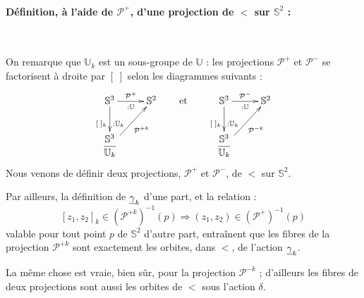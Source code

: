 \paragraph{D\'efinition, \`a l'aide de $\mathcal{P}^+$, d'une projection de $\lt$ sur $\mathbb{S}^2$ :}~\\
\par
On remarque que $\mathbb{U}_k$ est un sous-groupe de $\mathbb{U}$ : les projections $\mathcal{P}^+$ et $\mathcal{P}^-$ se factorisent \`a droite par $[\; ]$ selon les diagrammes suivants :
\[%
\xymatrix{%
\mathbb{S}^3\ar[d]_{[\; ]_k}^{:\mathbb{U}_k}\ar[r]^{\mathcal{P}^+}_{:\mathbb{U}}&\mathbb{S}^2\\%
\lt\ar[ru]_{\mathcal{P}^{+k}}&%
}%
\qquad\text{et}\qquad%
\xymatrix{%
\mathbb{S}^3\ar[d]_{[\; ]_k}^{:\mathbb{U}_k}\ar[r]^{\mathcal{P}^-}_{:\mathbb{U}}&\mathbb{S}^2\\%
\lt\ar[ru]_{\mathcal{P}^{-k}}&%
}%
\]
Nous venons de d\'efinir deux projections, $\mathcal{P}^+$ et $\mathcal{P}^-$, de $\lt$ sur $\mathbb{S}^2$.
\par
Par ailleurs, la d\'efinition de $\underline{\gamma}_{k}$ d'une part, et la relation :
\[[z_1,z_2]_k\in\left(\mathcal{P}^{+k}\right)^{-1}(p)\Rightarrow (z_1,z_2)\in\left(\mathcal{P}^+\right)^{-1}(p)\]\label{inc}
valable pour tout point $p$ de $\mathbb{S}^2$ d'autre part, entra\^inent que les fibres de la projection $\mathcal{P}^{+k}$ sont exactement les orbites, dans $\lt$, de l'action $\underline{\gamma}_{k}$.
\par
La m\^eme chose est vraie, bien s\^ur, pour la projection $\mathcal{P}^{-k}$ ; d'ailleurs les fibres de deux projections sont aussi les orbites de $\lt$ sous l'action $\delta$.

